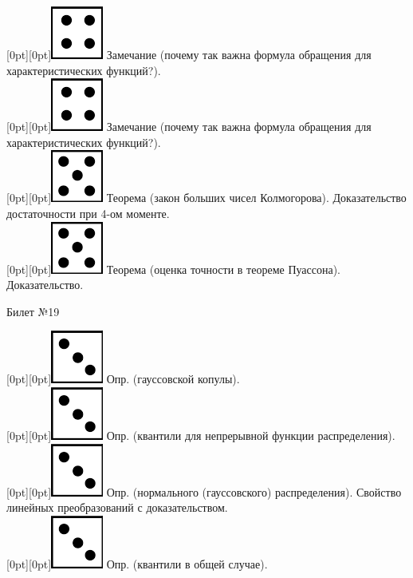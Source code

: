 \documentclass[10pt]{article}
\begin{document}
\raisebox{-1pt}[0pt][0pt]{\includegraphics[width=0.02\linewidth]{4.png}} Замечание (почему так важна формула обращения для характеристических функций?). \\

\raisebox{-1pt}[0pt][0pt]{\includegraphics[width=0.02\linewidth]{4.png}} Замечание (почему так важна формула обращения для характеристических функций?). \\

\raisebox{-1pt}[0pt][0pt]{\includegraphics[width=0.02\linewidth]{5.png}} Теорема (закон больших чисел Колмогорова). Доказательство достаточности при 4-ом моменте. \\

\raisebox{-1pt}[0pt][0pt]{\includegraphics[width=0.02\linewidth]{5.png}} Теорема (оценка точности в теореме Пуассона). Доказательство. \\

\begin{center} {\Large Билет №19} \end{center} 

\raisebox{-1pt}[0pt][0pt]{\includegraphics[width=0.02\linewidth]{3.png}} Опр. (гауссовской копулы). \\

\raisebox{-1pt}[0pt][0pt]{\includegraphics[width=0.02\linewidth]{3.png}}   Опр. (квантили для непрерывной функции распределения). \\

\raisebox{-1pt}[0pt][0pt]{\includegraphics[width=0.02\linewidth]{3.png}}  Опр. (нормального (гауссовского) распределения). Свойство линейных преобразований с доказательством. \\

\raisebox{-1pt}[0pt][0pt]{\includegraphics[width=0.02\linewidth]{3.png}}   Опр. (квантили в общей случае). \\
\end{document}
